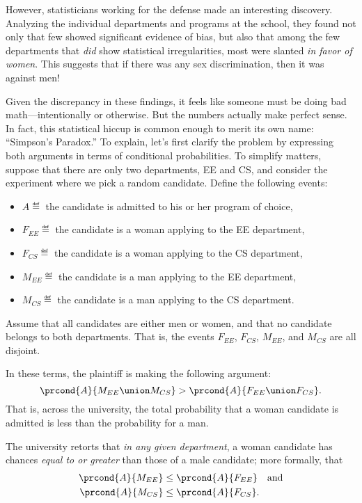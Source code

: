 However, statisticians working for the defense made an interesting
discovery.  Analyzing the individual departments and programs at the
school, they found not only that few showed significant evidence of bias, but
also that among the few departments that \emph{did} show
statistical irregularities, most were slanted \emph{in favor of women}.
This suggests that if there was any sex discrimination, then it was
against men!  

Given the discrepancy in these findings, it feels like someone must be
doing bad math---intentionally or otherwise.  But the numbers actually make
perfect sense.  In fact, this statistical hiccup is common enough to
merit its own name: ``Simpson's Paradox.'' To explain, let's first
clarify the problem by expressing both arguments in terms of
conditional probabilities.  To simplify matters, suppose that there
are only two departments, EE and CS, and consider the experiment where
we pick a random candidate.  Define the following events:
%
\begin{itemize}
\item $A \eqdef$ the candidate is admitted to his or her program of choice,
\item $F_{EE} \eqdef$ the candidate is a woman applying to the EE department,
\item $F_{CS} \eqdef$ the candidate is a woman applying to the CS department,
\item $M_{EE} \eqdef$ the candidate is a man applying to the EE department,
\item $M_{CS} \eqdef$ the candidate is a man applying to the CS department.
\end{itemize}
Assume that all candidates are either men or women, and that no
candidate belongs to both departments.  That is, the events $F_{EE}$,
$F_{CS}$, $M_{EE}$, and $M_{CS}$ are all disjoint.

In these terms, the plaintiff is making the following argument:
\[
    \prcond{A}{M_{EE} \union M_{CS}} > \prcond{A}{F_{EE} \union F_{CS}}.
\]
That is, across the university, the total probability that a woman candidate
is admitted is less than the probability for a man.

The university retorts that \emph{in any given department}, a woman
candidate has chances \emph{equal to or greater} than those of a male
candidate; more formally, that
\begin{align*}
\prcond{A}{M_{EE}} & \leq \prcond{A}{F_{EE}} \quad\text{and}\\
\prcond{A}{M_{CS}} & \leq \prcond{A}{F_{CS}}.
\end{align*}

